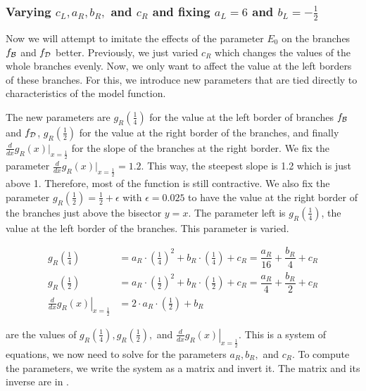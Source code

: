 \subsubsection{Varying $c_L, a_R, b_R,$ and $c_R$ and fixing $a_L = 6$ and $b_L = -\frac{1}{2}$}

Now we will attempt to imitate the effects of the parameter $E_0$ on the branches $f_{\mathcal{B}}$ and $f_{\mathcal{D}}$ better.
Previously, we just varied $c_R$ which changes the values of the whole branches evenly.
Now, we only want to affect the value at the left borders of these branches.
For this, we introduce new parameters that are tied directly to characteristics of the model function.

The new parameters are $g_R\left(\frac{1}{4}\right)$ for the value at the left border of branches $f_{\mathcal{B}}$ and $f_{\mathcal{D}}$, $g_R\left(\frac{1}{2}\right)$ for the value at the right border of the branches, and finally $\frac{d}{dx} g_R(x) |_{x = \frac{1}{2}}$ for the slope of the branches at the right border.
We fix the parameter $\frac{d}{dx} g_R(x) |_{x =  \frac{1}{2}} = 1.2$.
This way, the steepest slope is 1.2 which is just above 1.
Therefore, most of the function is still contractive.
We also fix the parameter $g_R\left(\frac{1}{2}\right) = \frac{1}{2} + \epsilon$ with $\epsilon = 0.025$ to have the value at the right border of the branches just above the bisector $y = x$.
The parameter left is $g_R\left(\frac{1}{4}\right)$, the value at the left border of the branches.
This parameter is varied.

\begin{subequations}
	\begin{align}
		g_R\left(\frac{1}{4}\right)                                     & = a_R \cdot \left(\frac{1}{4}\right)^2 + b_R \cdot \left(\frac{1}{4}\right) + c_R = \dfrac{a_R}{16} + \dfrac{b_R}{4} + c_R \label{equ:setup.quad.hyper.A} \\
		g_R\left(\frac{1}{2}\right)                                     & = a_R \cdot \left(\frac{1}{2}\right)^2 + b_R \cdot \left(\frac{1}{2}\right) + c_R = \dfrac{a_R}{4} + \dfrac{b_R}{2} + c_R \label{equ:setup.quad.hyper.B}  \\
		\left. \frac{d}{dx} g_R\left(x\right) \right|_{x = \frac{1}{2}} & = 2 \cdot a_R \cdot \left(\frac{1}{2}\right) + b_R \label{equ:setup.quad.hyper.C}
	\end{align}
\end{subequations}

 are the values of $g_R\left(\frac{1}{4}\right), g_R\left(\frac{1}{2}\right),$ and $\left. \frac{d}{dx} g_R\left(x\right) \right|_{x = \frac{1}{2}}$.
This is a system of equations, we now need to solve for the parameters $a_R, b_R,$ and $c_R$.
To compute the parameters, we write the system as a matrix and invert it.
The matrix and its inverse are in .

